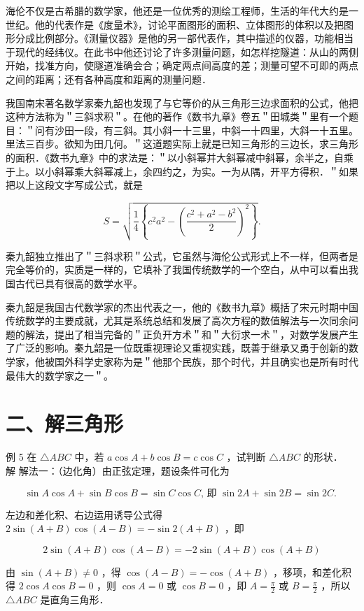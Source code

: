 \documentclass[10pt]{article}
\begin{document}
海伦不仅是古希腊的数学家，他还是一位优秀的测绘工程师，生活的年代大约是一世纪。他的代表作是《度量术》，讨论平面图形的面积、立体图形的体积以及把图形分成比例部分。《测量仪器》是他的另一部代表作，其中描述的仪器，功能相当于现代的经纬仪。在此书中他还讨论了许多测量问题，如怎样挖隧道：从山的两侧开始，找准方向，使隧道准确会合；确定两点间高度的差；测量可望不可即的两点之间的距离；还有各种高度和距离的测量问题．

我国南宋著名数学家秦九韶也发现了与它等价的从三角形三边求面积的公式，他把这种方法称为＂三斜求积＂。在他的著作《数书九章》卷五＂田城类＂里有一个题目：＂问有沙田一段，有三斜。其小斜一十三里，中斜一十四里，大斜一十五里。里法三百步。欲知为田几何。＂这道题实际上就是已知三角形的三边长，求三角形的面积．《数书九章》中的求法是：＂以小斜幂并大斜幂减中斜幂，余半之，自乘于上。以小斜幂乘大斜幂减上，余四约之，为实。一为从隅，开平方得积．＂如果把以上这段文字写成公式，就是

\[
S=\sqrt{\frac{1}{4}\left\{c^{2} a^{2}-\left(\frac{c^{2}+a^{2}-b^{2}}{2}\right)^{2}\right\}} .
\]

秦九韶独立推出了＂三斜求积＂公式，它虽然与海伦公式形式上不一样，但两者是完全等价的，实质是一样的，它填补了我国传统数学的一个空白，从中可以看出我国古代已具有很高的数学水平。

秦九韶是我国古代数学家的杰出代表之一，他的《数书九章》概括了宋元时期中国传统数学的主要成就，尤其是系统总结和发展了高次方程的数值解法与一次同余问题的解法，提出了相当完备的＂正负开方术＂和＂大衍求一术＂，对数学发展产生了广泛的影响。秦九韶是一位既重视理论又重视实践，既善于继承又勇于创新的数学家，他被国外科学史家称为是＂他那个民族，那个时代，并且确实也是所有时代最伟大的数学家之一＂。

\section*{二、解三角形}
例 5 在 \(\triangle A B C\) 中，若 \(a \cos A+b \cos B=c \cos C\) ，试判断 \(\triangle A B C\) 的形状．\\
解 解法一：（边化角）由正弦定理，题设条件可化为

\[
\sin A \cos A+\sin B \cos B=\sin C \cos C \text {, 即 } \sin 2 A+\sin 2 B=\sin 2 C \text {. }
\]

左边和差化积、右边运用诱导公式得 \(2 \sin (A+B) \cos (A-B)=-\sin 2(A+B)\) ，即

\[
2 \sin (A+B) \cos (A-B)=-2 \sin (A+B) \cos (A+B)
\]

由 \(\sin (A+B) \neq 0\) ，得 \(\cos (A-B)=-\cos (A+B)\) ，移项，和差化积得 \(2 \cos A \cos B=0\) ，则 \(\cos A=0\) 或 \(\cos B=0\) ，即 \(A=\frac{\pi}{2}\) 或 \(B=\frac{\pi}{2}\) ，所以 \(\triangle A B C\) 是直角三角形．
\end{document}
